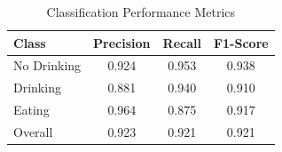 
\begin{table}[h]
\centering
\caption{Classification Performance Metrics}
\label{tab:classification_metrics}
\begin{tabular}{l|ccc}
\hline
\textbf{Class} & \textbf{Precision} & \textbf{Recall} & \textbf{F1-Score} \\
\hline
No Drinking & 0.924 & 0.953 & 0.938 \\
Drinking & 0.881 & 0.940 & 0.910 \\
Eating & 0.964 & 0.875 & 0.917 \\
\hline
Overall & 0.923 & 0.921 & 0.921 \\
\hline
\end{tabular}
\end{table}
